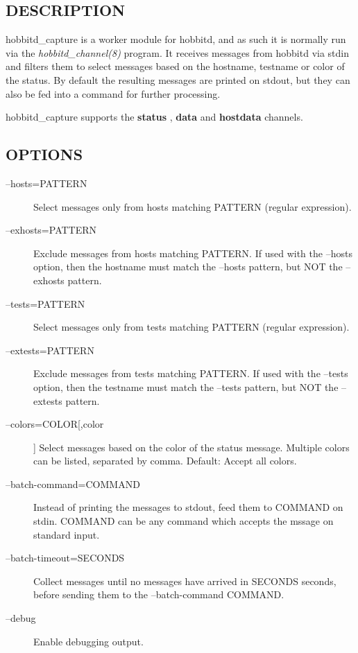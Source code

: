  
\subsection{DESCRIPTION}
 hobbitd\_capture is a worker module for hobbitd, and as such it is
 normally run via the \emph{hobbitd\_channel(8)} program. It receives
 messages from hobbitd via stdin and filters them to select messages
 based on the hostname, testname or color of the status. By default
 the resulting messages are printed on stdout, but they can also be
 fed into a command for further processing. 


  hobbitd\_capture supports the \textbf{status}
, \textbf{data}
 and \textbf{hostdata}
 channels. 


 
\subsection{OPTIONS}
\begin{description}
\item[--hosts=PATTERN] Select messages only from hosts matching
  PATTERN (regular expression). 


 

\item[--exhosts=PATTERN] Exclude messages from hosts matching
  PATTERN. If used with the --hosts option, then the hostname must
  match the --hosts pattern, but NOT the --exhosts pattern. 


 

\item[--tests=PATTERN] Select messages only from tests matching PATTERN (regular expression). 

 

\item[--extests=PATTERN] Exclude messages from tests matching
  PATTERN. If used with the --tests option, then the testname must
  match the --tests pattern, but NOT the --extests pattern. 


 

\item[--colors=COLOR[,color]] Select messages based on the color of
  the status message. Multiple colors can be listed, separated by
  comma. Default: Accept all colors. 


 

\item[--batch-command=COMMAND] Instead of printing the messages to
  stdout, feed them to COMMAND on stdin. COMMAND can be any command
  which accepts the mssage on standard input. 


 

\item[--batch-timeout=SECONDS] Collect messages until no messages have arrived in SECONDS seconds, before sending them to the --batch-command COMMAND. 

 

\item[--debug] Enable debugging output. 

 


\end{description}
